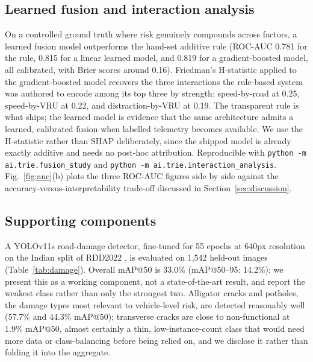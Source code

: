 \documentclass[journal]{IEEEtran}
\begin{document}
\subsection{Learned fusion and interaction analysis}
\label{sec:fusion-results}

On a controlled ground truth where risk genuinely compounds across factors, a learned fusion model outperforms the hand-set additive rule (ROC-AUC 0.781 for the rule, 0.815 for a linear learned model, and 0.819 for a gradient-boosted model, all calibrated, with Brier scores around 0.16). Friedman's H-statistic applied to the gradient-boosted model recovers the three interactions the rule-based system was authored to encode among its top three by strength: speed-by-road at 0.25, speed-by-VRU at 0.22, and distraction-by-VRU at 0.19. The transparent rule is what ships; the learned model is evidence that the same architecture admits a learned, calibrated fusion when labelled telemetry becomes available. We use the H-statistic rather than SHAP deliberately, since the shipped model is already exactly additive and needs no post-hoc attribution. Reproducible with \texttt{python -m ai.trie.fusion\_study} and \texttt{python -m ai.trie.interaction\_analysis}. Fig.~\ref{fig:auc}(b) plots the three ROC-AUC figures side by side against the accuracy-versus-interpretability trade-off discussed in Section~\ref{sec:discussion}.

\subsection{Supporting components}

A YOLOv11s road-damage detector, fine-tuned for 55 epochs at 640px resolution on the Indian split of RDD2022 \cite{arya2024}, is evaluated on 1,542 held-out images (Table~\ref{tab:damage}). Overall mAP@50 is 33.0\% (mAP@50--95: 14.2\%); we present this as a working component, not a state-of-the-art result, and report the weakest class rather than only the strongest two. Alligator cracks and potholes, the damage types most relevant to vehicle-level risk, are detected reasonably well (57.7\% and 44.3\% mAP@50); transverse cracks are close to non-functional at 1.9\% mAP@50, almost certainly a thin, low-instance-count class that would need more data or class-balancing before being relied on, and we disclose it rather than folding it into the aggregate.
\end{document}
